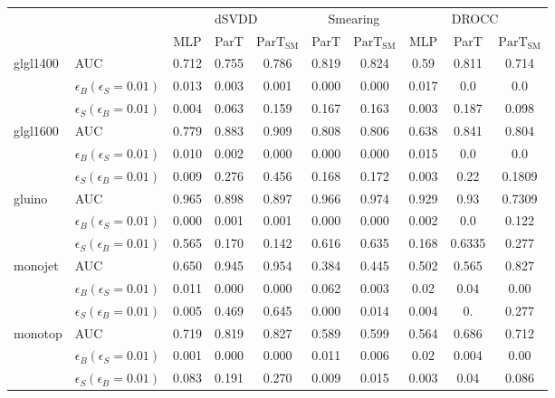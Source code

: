\begin{table}[H]
    \centering
    \setlength{\tabcolsep}{4pt}
    \begin{tabular}{ll|ccc|cc|ccc}
    \hline
    \multicolumn{2}{c|}{} & \multicolumn{3}{c|}{dSVDD} & \multicolumn{2}{c|}{Smearing} & \multicolumn{3}{c}{DROCC}  \\
     & & MLP & ParT & $\text{ParT}_{\text{SM}}$ & ParT & $\text{ParT}_{\text{SM}}$ & MLP & ParT & $\text{ParT}_{\text{SM}}$ \\
    \hline \hline
    \multirow{3}{*}{glgl1400} & AUC   & 0.712 & 0.755 & 0.786 & 0.819 & 0.824 & 0.59 & 0.811 & 0.714 \\
    & $\epsilon_B(\epsilon_S=0.01)$  & 0.013 & 0.003 & 0.001 & 0.000 & 0.000 & 0.017 & 0.0 & 0.0 \\
    & $\epsilon_S(\epsilon_B=0.01)$  & 0.004 & 0.063 & 0.159 & 0.167 & 0.163 & 0.003 & 0.187 & 0.098 \\
    \hline
    \multirow{3}{*}{glgl1600} & AUC    & 0.779 & 0.883 & 0.909 & 0.808 & 0.806 & 0.638 & 0.841 & 0.804 \\
    & $\epsilon_B(\epsilon_S=0.01)$  & 0.010 & 0.002 & 0.000 & 0.000 & 0.000 & 0.015 & 0.0 & 0.0 \\
    & $\epsilon_S(\epsilon_B=0.01)$  & 0.009 & 0.276 & 0.456 & 0.168 & 0.172 & 0.003 & 0.22 & 0.1809 \\
    \hline
    \multirow{3}{*}{gluino} & AUC    & 0.965 & 0.898 & 0.897 & 0.966 & 0.974 & 0.929 & 0.93 & 0.7309 \\
    & $\epsilon_B(\epsilon_S=0.01)$  & 0.000 & 0.001 & 0.001 & 0.000 & 0.000 & 0.002 & 0.0 & 0.122 \\
    & $\epsilon_S(\epsilon_B=0.01)$  & 0.565 & 0.170 & 0.142 & 0.616 & 0.635 & 0.168 & 0.6335 & 0.277 \\
    \hline
    \multirow{3}{*}{monojet} & AUC    & 0.650 & 0.945 & 0.954 & 0.384 & 0.445 & 0.502 & 0.565 & 0.827 \\
    & $\epsilon_B(\epsilon_S=0.01)$  & 0.011 & 0.000 & 0.000 & 0.062 & 0.003 & 0.02 & 0.04 & 0.00 \\
    & $\epsilon_S(\epsilon_B=0.01)$  & 0.005 & 0.469 & 0.645 & 0.000 & 0.014 & 0.004 & 0. & 0.277 \\
    \hline
    \multirow{3}{*}{monotop} & AUC    & 0.719 & 0.819 & 0.827 & 0.589 & 0.599 & 0.564 & 0.686 & 0.712 \\
    & $\epsilon_B(\epsilon_S=0.01)$  & 0.001 & 0.000 & 0.000 & 0.011 & 0.006 & 0.02 & 0.004 & 0.00 \\
    & $\epsilon_S(\epsilon_B=0.01)$  & 0.083 & 0.191 & 0.270 & 0.009 & 0.015 & 0.003 & 0.04 & 0.086 \\

\end{tabular}
\end{table}
